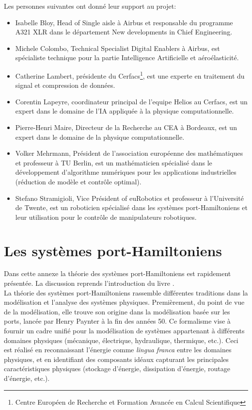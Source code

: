 \documentclass[12pt, french]{article}
\begin{document}
	Les personnes suivantes ont donné leur support au projet:
	\begin{itemize}
		\item Isabelle Bloy, Head of Single aisle  à Airbus et responsable du programme A321 XLR dans le département New developments in Chief Engineering.
		\item Michele Colombo, Technical Specialist Digital Enablers à Airbus, est spécialiste technique pour la partie Intelligence Artificielle et aéroélasticité.
		\item Catherine Lambert, présidente du Cerfacs\footnote{Centre Européen de Recherche et Formation Avancée en Calcul Scientifique}, est une experte en traitement du signal et compression de données. 
		\item Corentin Lapeyre, coordinateur principal de l'equipe Helios au Cerfacs, est un expert dans le domaine de l'IA appliquée à la physique computationnelle.
		\item Pierre-Henri Maire, Directeur de la Recherche au CEA à Bordeaux, est un expert dans le domaine de la physique computationnelle.
		\item Volker Mehrmann, Président de l'association européenne des mathématiques et professeur à TU Berlin, est un mathématicien spécialisé dans le développement d'algorithme numériques pour les applications industrielles (réduction de modèle et contrôle optimal).
		\item Stefano Stramigioli, Vice Président of euRobotics et professeur à l'Université de Twente, est un roboticien spécialisé dans les systèmes port-Hamiltoniens et leur utilisation pour le contrôle de manipulateurs robotiques.
	\end{itemize}




\section{Les systèmes port-Hamiltoniens}\label{sec:pHreview}

Dans cette annexe la théorie des systèmes port-Hamiltoniens est rapidement présentée. La discussion reprends l'introduction du livre \cite{van2014port}. \\

La théorie des systèmes port-Hamiltoniens rassemble différentes traditions dans la modélisation et l'analyse des systèmes physiques. Premièrement, du point de vue de la modélisation, elle trouve son origine dans la modélisation basée sur les ports, lancée par Henry Paynter à la fin des années 50. Ce formalisme vise à fournir un cadre unifié pour la modélisation de systèmes appartenant à différents domaines physiques (mécanique, électrique, hydraulique, thermique, etc.). Ceci est réalisé en reconnaissant l'énergie comme \textit{lingua franca} entre les domaines physiques, et en identifiant des composants idéaux capturant les principales caractéristiques physiques (stockage d'énergie, dissipation d'énergie, routage d'énergie, etc.).  \\
\end{document}
